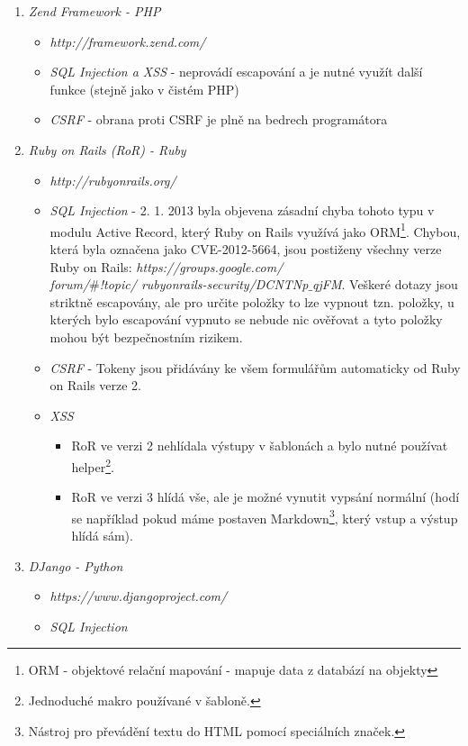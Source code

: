 \documentclass[12pt, a4paper]{report}
\begin{document}
\begin{enumerate}
\item \textit{Zend Framework - PHP} 
\begin{itemize}
\item \textit{http://framework.zend.com/}
\item \textit{SQL Injection a XSS} - neprovádí escapování a je nutné využít další funkce (stejně jako v čistém PHP)
\item \textit{CSRF} - obrana proti CSRF je plně na bedrech programátora
\end{itemize}
\item \textit{Ruby on Rails (RoR) - Ruby}
\begin{itemize}
\item \textit{http://rubyonrails.org/}
\item \textit{SQL Injection} - 2. 1. 2013 byla objevena zásadní chyba tohoto typu v modulu Active Record, který Ruby on Rails využívá jako ORM\footnote{ORM - objektové relační mapování - mapuje data z databází na objekty}. Chybou, která byla označena jako CVE-2012-5664, jsou postiženy všechny verze Ruby on Rails: \textit{https://groups.google.com/\\forum/$\#$!topic/ rubyonrails-security/DCNTNp$\_$qjFM}. Veškeré dotazy jsou striktně escapovány, ale pro určite položky to lze vypnout tzn. položky, u kterých bylo escapování vypnuto se nebude nic ověřovat a tyto položky mohou být bezpečnostním rizikem.
\item \textit{CSRF} - Tokeny jsou přidávány ke všem formulářům automaticky od Ruby on Rails verze 2.
\item \textit{XSS} 
\begin{itemize}
\item RoR ve verzi 2 nehlídala výstupy v šablonách a bylo nutné používat helper\footnote{Jednoduché makro používané v šabloně.}.
\item RoR ve verzi 3 hlídá vše, ale je možné vynutit vypsání normální (hodí se například pokud máme  postaven Markdown\footnote{Nástroj pro převádění textu do HTML pomocí speciálních značek.}, který vstup a výstup hlídá sám).
\end{itemize}
\end{itemize} 
\item \textit{DJango - Python}
\begin{itemize}
\item \textit{https://www.djangoproject.com/}
\item \textit{SQL Injection}
\begin{itemize}

\end{itemize}
\end{itemize}
\end{enumerate}
\end{document}
